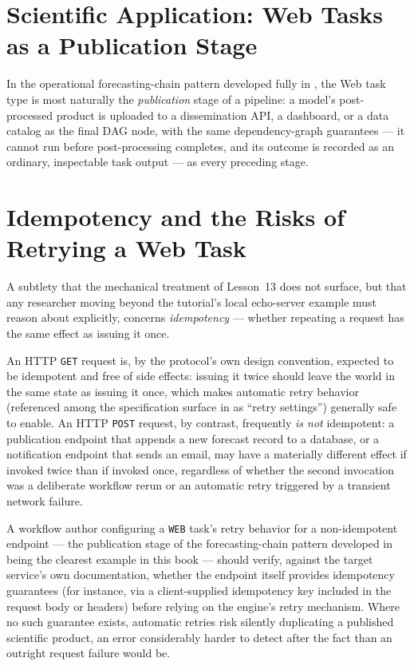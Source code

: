 \section{Scientific Application: Web Tasks as a Publication Stage}

In the operational forecasting-chain pattern developed fully in
, the Web task type is most naturally the
\emph{publication} stage of a pipeline: a model's post-processed product is
uploaded to a dissemination API, a dashboard, or a data catalog as the final
DAG node, with the same dependency-graph guarantees --- it cannot run before
post-processing completes, and its outcome is recorded as an ordinary,
inspectable task output --- as every preceding stage.

\section{Idempotency and the Risks of Retrying a Web Task}

A subtlety that the mechanical treatment of Lesson~13 does not surface, but
that any researcher moving beyond the tutorial's local echo-server example
must reason about explicitly, concerns \emph{idempotency} --- whether
repeating a request has the same effect as issuing it once.

An HTTP \texttt{GET} request is, by the protocol's own design convention,
expected to be idempotent and free of side effects: issuing it twice should
leave the world in the same state as issuing it once, which makes automatic
retry behavior (referenced among the specification surface in
 as ``retry settings'') generally safe to enable. An
HTTP \texttt{POST} request, by contrast, frequently \emph{is not}
idempotent: a publication endpoint that appends a new forecast record to a
database, or a notification endpoint that sends an email, may have a
materially different effect if invoked twice than if invoked once,
regardless of whether the second invocation was a deliberate workflow
rerun or an automatic retry triggered by a transient network failure.

\begin{cautionbox}
A workflow author configuring a \texttt{WEB} task's retry behavior for a
non-idempotent endpoint --- the publication stage of the forecasting-chain
pattern developed in  being the clearest example in this
book --- should verify, against the target service's own documentation,
whether the endpoint itself provides idempotency guarantees (for instance,
via a client-supplied idempotency key included in the request body or
headers) before relying on the engine's retry mechanism. Where no such
guarantee exists, automatic retries risk silently duplicating a published
scientific product, an error considerably harder to detect after the fact
than an outright request failure would be.
\end{cautionbox}

